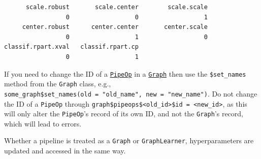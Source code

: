 \begin{verbatim}
      scale.robust       scale.center        scale.scale 
                 0                  0                  1 
     center.robust      center.center       center.scale 
                 0                  1                  0 
classif.rpart.xval   classif.rpart.cp 
                 0                  1 
\end{verbatim}

\begin{tcolorbox}[enhanced jigsaw, opacitybacktitle=0.6, rightrule=.15mm, opacityback=0, arc=.35mm, breakable, titlerule=0mm, colframe=quarto-callout-warning-color-frame, coltitle=black, bottomrule=.15mm, toprule=.15mm, colback=white, colbacktitle=quarto-callout-warning-color!10!white, bottomtitle=1mm, toptitle=1mm, title=\textcolor{quarto-callout-warning-color}{\faExclamationTriangle}\hspace{0.5em}{PipeOp IDs in Graphs}, leftrule=.75mm, left=2mm]

If you need to change the ID of a
\href{https://mlr3pipelines.mlr-org.com/reference/PipeOp.html}{\texttt{PipeOp}}
in a
\href{https://mlr3pipelines.mlr-org.com/reference/Graph.html}{\texttt{Graph}}
then use the \texttt{\$set\_names} method from the \texttt{Graph} class,
e.g.,
\texttt{some\_graph\$set\_names(old\ =\ "old\_name",\ new\ =\ "new\_name")}.
Do not change the ID of a \texttt{PipeOp} through
\texttt{graph\$pipeops\$\textless{}old\_id\textgreater{}\$id\ =\ \textless{}new\_id\textgreater{}},
as this will only alter the \texttt{PipeOp}'s record of its own ID, and
not the \texttt{Graph}'s record, which will lead to errors.

\end{tcolorbox}

Whether a pipeline is treated as a \texttt{Graph} or
\texttt{GraphLearner}, hyperparameters are
updated and accessed in the same way.

\begin{Shaded}
\begin{Highlighting}[]
\SpecialCharTok{$}\SpecialCharTok{$}\SpecialCharTok{$}\OtherTok{=} 
\OtherTok{=} 
\SpecialCharTok{$}\SpecialCharTok{$}\SpecialCharTok{$}\OtherTok{=} 
\SpecialCharTok{$}\SpecialCharTok{$}
\end{Highlighting}
\end{Shaded}

